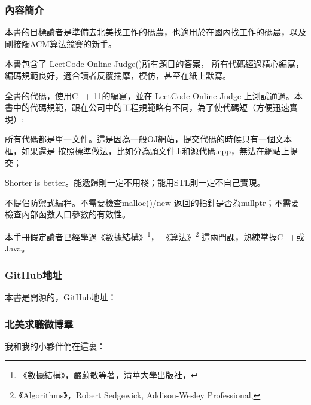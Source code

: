 \subsubsection{內容簡介}
本書的目標讀者是準備去北美找工作的碼農，也適用於在國內找工作的碼農，以及剛接觸ACM算法競賽的新手。

本書包含了 LeetCode Online Judge()所有題目的答案，
所有代碼經過精心編寫，編碼規範良好，適合讀者反覆揣摩，模仿，甚至在紙上默寫。

全書的代碼，使用C++ 11的編寫，並在 LeetCode Online Judge 上測試通過。本書中的代碼規範，跟在公司中的工程規範略有不同，為了使代碼短（方便迅速實現）:

\begindot
\item 所有代碼都是單一文件。這是因為一般OJ網站，提交代碼的時候只有一個文本框，如果還是
按照標準做法，比如分為頭文件.h和源代碼.cpp，無法在網站上提交；

\item Shorter is better。能遞歸則一定不用棧；能用STL則一定不自己實現。

\item 不提倡防禦式編程。不需要檢查malloc()/new 返回的指針是否為nullptr；不需要檢查內部函數入口參數的有效性。
\myenddot

本手冊假定讀者已經學過《數據結構》\footnote{《數據結構》，嚴蔚敏等著，清華大學出版社，
}，
《算法》\footnote{《Algorithms》，Robert Sedgewick, Addison-Wesley Professional, }
這兩門課，熟練掌握C++或Java。

\subsubsection{GitHub地址}
本書是開源的，GitHub地址：

\subsubsection{北美求職微博羣}
我和我的小夥伴們在這裏：
